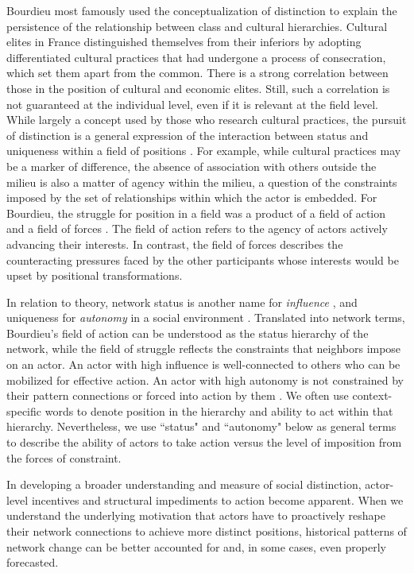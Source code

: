 \documentclass[12pt]{article}
\begin{document}
Bourdieu \citeyearpar{bourdieu1984distinction} most famously used the conceptualization of distinction to explain the persistence of the relationship between class and cultural hierarchies. Cultural elites in France distinguished themselves from their inferiors by adopting differentiated cultural practices that had undergone a process of consecration, which set them apart from the common. There is a strong correlation between those in the position of cultural and economic elites. Still, such a correlation is not guaranteed at the individual level, even if it is relevant at the field level.   
While largely a concept used by those who research cultural practices, the pursuit of distinction is a general expression of the interaction between status and uniqueness within a field of positions \citep{anheier1995forms}. For example, while cultural practices may be a marker of difference, the absence of association with others outside the milieu is also a matter of agency within the milieu, a question of the constraints imposed by the set of relationships within which the actor is embedded. For Bourdieu, the struggle for position in a field was a product of a field of action and a field of forces \citep{martin2003field}. The field of action refers to the agency of actors actively advancing their interests. In contrast, the field of forces describes the counteracting pressures faced by the other participants whose interests would be upset by positional transformations.   

In relation to theory, network status is another name for \textit{influence} \citep{friedkin1991theoretical}, and uniqueness for \textit{autonomy} in a social environment \citep{burt1980autonomy}. Translated into network terms, Bourdieu's field of action can be understood as the status hierarchy of the network, while the field of struggle reflects the constraints that neighbors impose on an actor. An actor with high influence is well-connected to others who can be mobilized for effective action. An actor with high autonomy is not constrained by their pattern connections or forced into action by them \citep{burt76}. We often use context-specific words to denote position in the hierarchy and ability to act within that hierarchy. Nevertheless, we use ``status" and ``autonomy" below as general terms to describe the ability of actors to take action versus the level of imposition from the forces of constraint.

In developing a broader understanding and measure of social distinction, actor-level incentives and structural impediments to action become apparent. When we understand the underlying motivation that actors have to proactively reshape their network connections to achieve more distinct positions, historical patterns of network change can be better accounted for and, in some cases, even properly forecasted. 
\end{document}
